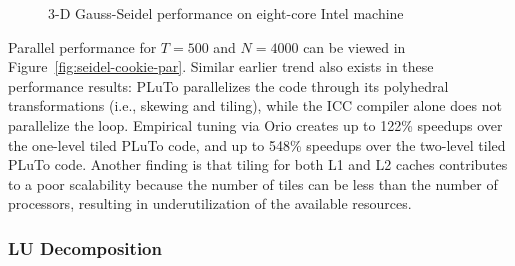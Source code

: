 \begin{figure} [htb]
\begin{center} 
    
\end{center}
\vspace{-.2in} 
\caption{3-D Gauss-Seidel performance on eight-core Intel machine} 
\label{fig:seidel-cookie-results} 
\end{figure} 

Parallel performance for $T=500$ and $N=4000$ can be viewed in
Figure~\ref{fig:seidel-cookie-par}. Similar earlier trend also exists
in these performance results: PLuTo parallelizes the code through its
polyhedral transformations (i.e., skewing and tiling), while the ICC
compiler alone does not parallelize the loop. Empirical tuning via
Orio creates up to 122\% speedups over the one-level tiled PLuTo code,
and up to 548\% speedups over the two-level tiled PLuTo code. Another
finding is that tiling for both L1 and L2 caches contributes to a poor
scalability because the number of tiles can be less than the number of
processors, resulting in underutilization of the available resources.

\subsubsection{LU Decomposition}  
 
